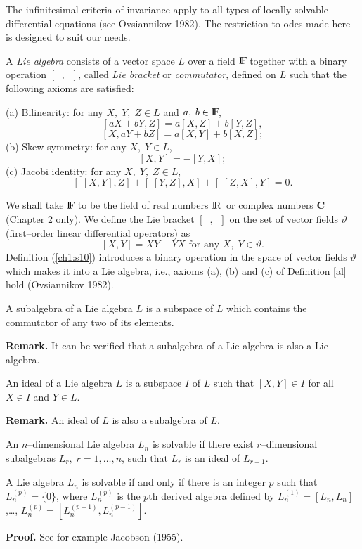 The infinitesimal criteria of invariance apply to all types of
locally solvable differential equations (see Ovsiannikov 1982).
The restriction to odes made here is designed to suit our needs.
\begin{defi}
\label{al}
\begin{em}
A {\em Lie algebra} consists of a vector space $L$ over a field $\mathrm{I\!F\!}$
together with a binary operation $[\;\;,\;\;]$, called {\em Lie bracket} or
{\em commutator}, defined on $L$ such that the following axioms are
satisfied:

(a) Bilinearity: for any $X,\;Y,\;Z\in L$ and $a,\;b\in \mathrm{I\!F\!}$,
\[ [aX+bY,Z]=a[X,Z]+b[Y,Z],\]
\[ [X,aY+bZ]=a[X,Y]+b[X,Z];\]
(b) Skew-symmetry: for any $X,\;Y\in L$,
\[ [X,Y]=-[Y,X];\]
(c) Jacobi identity: for any $X,\;Y,\;Z \in L$,
\[ [\;[X,Y],Z]+[\;[Y,Z],X]+[\;[Z,X],Y]=0.\]
\end{em}
\end{defi}
We shall take $\mathrm{I\!F\!}$  to be the field of real numbers $\mathrm{I\!R\!}\;$  or complex numbers
$\mathbf{C}$ (Chapter 2 only). We define the Lie bracket $[\;\;,\;\;]$ on the set of
vector fields $\vartheta$ (first--order linear differential operators) as
\begin{equation}
\label{ch1:s10}
[X,Y]=XY-YX   \mbox{  for any $X,\;Y\in \vartheta .$}
\end{equation}
Definition (\ref{ch1:s10}) introduces a binary operation in the space of vector
fields $\vartheta$ which makes it into a Lie algebra, i.e., axioms (a), (b) and
(c) of Definition \ref{al} hold (Ovsiannikov 1982).
\begin{defi}
\label{ch1:sub}
\begin{em}
A subalgebra of a Lie algebra $L$ is a subspace of $L$ which contains the
commutator of any two of its elements. 
\end{em}
\end{defi}
{\bf Remark.} It can be verified that a subalgebra of a Lie algebra is also
a Lie algebra.
\begin{defi}
\label{id}
\begin{em}
An ideal of a Lie algebra $L$ is a subspace $I$ of $L$  such that
$[X,Y]\in I$ for all $X\in I$ and $Y\in L$.
\end{em}
\end{defi}
{\bf Remark.} An ideal of $L$ is also a subalgebra of $L$.
\begin{defi}
\label{ch1:sol}
\begin{em}
An $n$--dimensional Lie algebra $L_n$ is solvable if there exist
$r$--dimensional subalgebras
$L_r,\; r=1,\ldots,n$, such that $L_r$ is an ideal of $L_{r+1}$.
\end{em}
\end{defi}
\begin{theo}
\begin{em}
A Lie algebra $L_n$ is solvable if and only if there is an integer $p$ such
that  $L_n ^{(p)}=\{0\}$, where $L_n^{(p)}$ is the $p$th derived algebra
defined by $L_n^{(1)}=[L_n,L_n]$,\ldots, $L_n^{(p)}=[L_n^{(p-1)},L_n^{(p-1)}].$
\end{em}
\end{theo}
{\bf Proof.} See for example Jacobson (1955).

